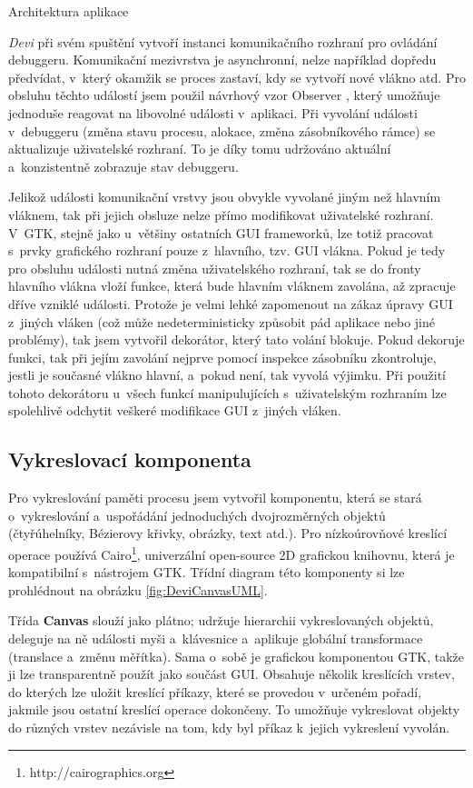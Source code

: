 \documentclass[czech,bachelor,male,python,dept460,hidelinks]{diploma}						%
\newcommand{\parspace}[1][]{
	\ifthenelse{\isempty{#1}}{\vspace{0mm}}{\vspace{#1}}
	\par
}
\begin{document}
\begin{section}{Architektura aplikace}
	\parspace \textit{Devi} při svém spuštění vytvoří instanci komunikačního rozhraní pro ovládání debuggeru. Komunikační mezivrstva je asynchronní,
	nelze například dopředu předvídat, v~který okamžik se proces zastaví, kdy se vytvoří nové vlákno atd. Pro obsluhu těchto událostí jsem použil návrhový vzor
	Observer \cite[326]{gof}, který umožňuje jednoduše reagovat na libovolné události v~aplikaci. Při vyvolání události v~debuggeru (změna stavu procesu,
	alokace, změna zásobníkového rámce) se aktualizuje uživatelské rozhraní. To je díky tomu udržováno aktuální a~konzistentně zobrazuje
	stav debuggeru.
	
	\parspace Jelikož události komunikační vrstvy jsou obvykle vyvolané jiným než hlavním vláknem, tak při jejich obsluze nelze přímo modifikovat uživatelské
	rozhraní. V~GTK, stejně jako u~většiny ostatních GUI frameworků, lze totiž pracovat s~prvky grafického rozhraní pouze z~hlavního, tzv. GUI vlákna.
	Pokud je tedy pro obsluhu události nutná změna uživatelského rozhraní, tak se do fronty hlavního vlákna vloží funkce, která bude hlavním vláknem zavolána,
	až zpracuje dříve vzniklé události. Protože je velmi lehké zapomenout na zákaz úpravy GUI z~jiných vláken (což může nedeterministicky způsobit pád
	aplikace nebo jiné problémy), tak jsem vytvořil dekorátor, který tato volání blokuje. Pokud dekoruje funkci, tak při jejím zavolání
	nejprve pomocí inspekce zásobníku zkontroluje, jestli je současné vlákno hlavní, a~pokud není, tak vyvolá výjimku. Při použití tohoto dekorátoru u~všech
	funkcí manipulujících s~uživatelským rozhraním lze spolehlivě odchytit veškeré modifikace GUI z~jiných vláken.
	
	\subsection{Vykreslovací komponenta}
	Pro vykreslování paměti procesu jsem vytvořil komponentu, která se stará o~vykreslování a~uspořádání jednoduchých dvojrozměrných objektů
	(čtyřúhelníky, Bézierovy křivky, obrázky, text atd.). Pro nízkoúrovňové kreslící operace používá Cairo\footnote{http://cairographics.org}, univerzální
	open-source 2D grafickou knihovnu, která je kompatibilní s~nástrojem GTK. Třídní diagram této komponenty si lze prohlédnout na obrázku
	\ref{fig:DeviCanvasUML}.
	
	
	Třída \textbf{Canvas} slouží jako plátno; udržuje hierarchii vykreslovaných objektů, deleguje na ně události myši a~klávesnice a~aplikuje globální transformace
	(translace a~změnu měřítka). Sama o~sobě je grafickou komponentou GTK, takže ji lze transparentně použít jako součást GUI.
	Obsahuje několik kreslících vrstev, do kterých lze uložit kreslící příkazy, které se provedou v~určeném pořadí, jakmile jsou ostatní kreslící operace dokončeny.
	To umožňuje vykreslovat objekty do různých vrstev nezávisle na tom, kdy byl příkaz k~jejich vykreslení vyvolán.
	

\end{section}
\end{document}

